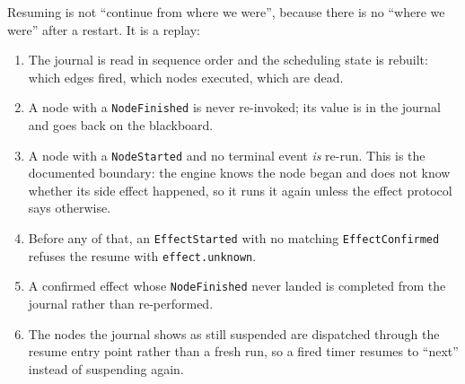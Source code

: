 Resuming is not \enquote{continue from where we were}, because there is no \enquote{where we were}
after a restart. It is a replay:

\begin{enumerate}
	\item The journal is read in sequence order and the scheduling state is rebuilt: which edges
	fired, which nodes executed, which are dead.
	\item A node with a \texttt{NodeFinished} is never re-invoked; its value is in the journal and
	goes back on the blackboard.
	\item A node with a \texttt{NodeStarted} and no terminal event \emph{is} re-run. This is the
	documented boundary: the engine knows the node began and does not know whether its side effect
	happened, so it runs it again unless the effect protocol says otherwise.
	\item Before any of that, an \texttt{EffectStarted} with no matching \texttt{EffectConfirmed}
	refuses the resume with \texttt{effect.unknown}.
	\item A confirmed effect whose \texttt{NodeFinished} never landed is completed from the journal
	rather than re-performed.
	\item The nodes the journal shows as still suspended are dispatched through the resume entry
	point rather than a fresh run, so a fired timer resumes to \enquote{next} instead of
	suspending again.
\end{enumerate}

\begin{center}

\end{center}

